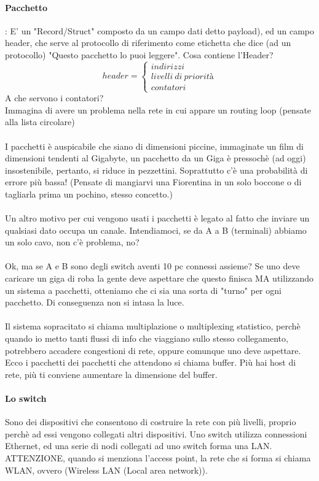 \documentclass[12pt, a4paper, openany, twoside]{book}
\begin{document}
\paragraph{Pacchetto}: E' un "Record/Struct" composto da un campo dati 
detto payload), ed un
campo header, che serve al protocollo di riferimento come etichetta che dice (ad 
un protocollo)  "Questo pacchetto lo puoi leggere".
Cosa contiene l'Header? 
$$header=\begin{cases}
indirizzi \\ livelli~di~priorità \\ contatori 
\end{cases}$$
A che servono i contatori? 	\\
Immagina di avere un problema nella rete in cui appare un routing loop (pensate
alla lista circolare)\\ \\
I pacchetti è auspicabile che siano di dimensioni piccine, immaginate un film 
di dimensioni tendenti al Gigabyte, un pacchetto da un Giga è pressochè (ad oggi)
insostenibile, pertanto, si riduce in pezzettini. Soprattutto c'è una probabilità
di errore più bassa! 
(Pensate di mangiarvi una Fiorentina in un solo boccone o di tagliarla prima un
pochino, stesso concetto.) \\ \\
Un altro motivo per cui vengono usati i pacchetti è legato al fatto che inviare
un qualsiasi dato occupa un canale. Intendiamoci, se da A a B (terminali) abbiamo un solo
cavo, non c'è problema, no?	\\ \\ Ok, ma se A e B sono degli switch aventi 10 pc 
connessi assieme? Se uno deve caricare un giga di roba la gente deve aspettare 
che questo finisca MA utilizzando un sistema a pacchetti, otteniamo che ci sia
una sorta di "turno" per ogni pacchetto. Di conseguenza non si intasa la luce.
\\ \\
Il sistema sopracitato si chiama multiplazione o multiplexing statistico, perchè
quando io metto tanti flussi di info che viaggiano sullo stesso collegamento, 
potrebbero accadere congestioni di rete, oppure comunque uno deve aspettare. Ecco
i pacchetti dei pacchetti che attendono si chiama buffer. Più hai host di rete,
più ti conviene aumentare la dimensione del buffer.
\\
\paragraph{Lo switch} Sono dei dispositivi che consentono di costruire la rete
con più livelli, proprio perchè ad essi vengono collegati altri dispositivi. 
Uno switch utilizza connessioni Ethernet, ed una serie di nodi collegati ad uno
switch forma una LAN. ATTENZIONE, quando si menziona l'access point, la rete 
che si forma si chiama WLAN, ovvero (Wireless LAN (Local area network)).
\end{document}
